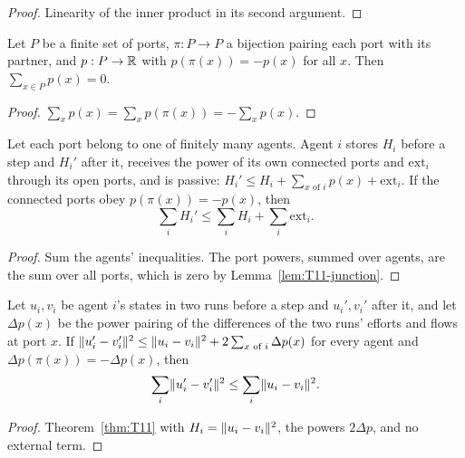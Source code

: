 \begin{proof}
  \leanok
  Linearity of the inner product in its second argument.
\end{proof}

\begin{lemma}\label{lem:T11-junction}
  \leanok
  Let $P$ be a finite set of ports, $\pi:P\to P$ a bijection pairing each port
  with its partner, and $p:P\to\mathbb{R}$ with $p(\pi(x))=-p(x)$ for all $x$.  Then
  $\sum_{x\in P}p(x)=0$.
\end{lemma}

\begin{proof}
  \leanok
  $\sum_xp(x)=\sum_xp(\pi(x))=-\sum_xp(x)$.
\end{proof}

\begin{theorem}\label{thm:T11}
  \leanok
  Let each port belong to one of finitely many agents.  Agent $i$ stores $H_i$
  before a step and $H_i'$ after it, receives the power of its own connected
  ports and $\mathrm{ext}_i$ through its open ports, and is passive:
  $H_i'\le H_i+\sum_{x\text{ of }i}p(x)+\mathrm{ext}_i$.  If the connected ports
  obey $p(\pi(x))=-p(x)$, then
  \[
    \sum_iH_i'\le\sum_iH_i+\sum_i\mathrm{ext}_i .
  \]
\end{theorem}

\begin{proof}
  \leanok
  Sum the agents' inequalities.  The port powers, summed over agents, are the
  sum over all ports, which is zero by Lemma~\ref{lem:T11-junction}.
\end{proof}

\begin{corollary}\label{cor:T11-nonexpansive}
  \leanok
  Let $u_i,v_i$ be agent $i$'s states in two runs before a step and $u_i',v_i'$
  after it, and let $\Delta p(x)$ be the power pairing of the differences of
  the two runs' efforts and flows at port $x$.  If
  $\lVert u_i'-v_i'\rVert^2\le\lVert u_i-v_i\rVert^2+2\sum_{x\text{ of }i}\Delta p(x)$ for
  every agent and $\Delta p(\pi(x))=-\Delta p(x)$, then
  \[
    \sum_i\lVert u_i'-v_i'\rVert^2\le\sum_i\lVert u_i-v_i\rVert^2 .
  \]
\end{corollary}

\begin{proof}
  \leanok
  Theorem~\ref{thm:T11} with $H_i=\lVert u_i-v_i\rVert^2$, the powers $2\Delta p$, and
  no external term.
\end{proof}
